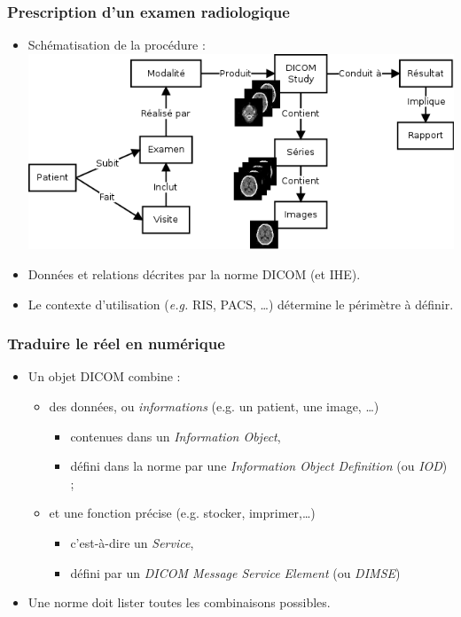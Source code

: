 	\frame
	{
		\frametitle{Prescription d'un examen radiologique}
		\begin{itemize}
			\item Sch\'ematisation de la proc\'edure :
			\includegraphics[width=\linewidth]{./figures/scenario.png}
			\item<2-> Donn\'ees et relations d\'ecrites par la norme DICOM (et IHE).
			\item<3-> Le contexte d'utilisation (\emph{e.g.} RIS, PACS, \ldots) d\'etermine le p\'erim\`etre \`a d\'efinir.
		\end{itemize}
	}

	\frame
	{
		\frametitle{Traduire le r\'eel en num\'erique}
		
		\begin{itemize}
			\item Un objet DICOM combine :
			\begin{itemize}
				\item<2-> des donn\'ees, ou \emph{informations} (e.g. un patient, une image, \ldots)
				\begin{itemize}
					\item<3-> contenues dans un \emph{Information Object},
					\item<4-> d\'efini dans la norme par une \emph{Information Object Definition} (ou \emph{IOD}) ;
				\end{itemize}
				
				\item<5-> et une fonction pr\'ecise (e.g. stocker, imprimer,\ldots)
				\begin{itemize}
					\item<6-> c'est-\`a-dire un \emph{Service},
					\item<7-> d\'efini par un \emph{DICOM Message Service Element} (ou \emph{DIMSE})
				\end{itemize}
			\end{itemize}
			\item<8-> Une norme doit lister toutes les combinaisons possibles.
		\end{itemize}
	}
	
